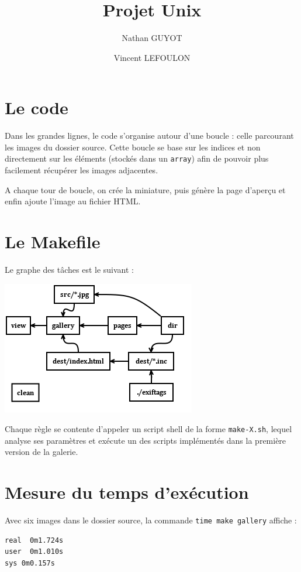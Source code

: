 \documentclass[a4paper,11pt]{article}
\title{Projet Unix}
\author{Nathan GUYOT \and Vincent LEFOULON}
\begin{document}
\maketitle

\section{Le code}

Dans les grandes lignes, le code s'organise autour d'une boucle : celle parcourant
les images du dossier source. Cette boucle se base sur les indices et non directement
sur les éléments (stockés dans un \verb+array+) afin de pouvoir plus facilement
récupérer les images adjacentes.

A chaque tour de boucle, on crée la miniature, puis génère la page d'aperçu et enfin ajoute l'image au fichier HTML.

\section{Le Makefile}

Le graphe des tâches est le suivant :

\includegraphics[width=320px]{MakefileGraph.png}

Chaque règle se contente d'appeler un script shell de la forme \verb+make-X.sh+, lequel analyse ses paramètres et exécute un des scripts implémentés dans la première version de la galerie.

\section{Mesure du temps d'exécution}

Avec six images dans le dossier source, la commande \verb+time make gallery+ affiche :

\begin{verbatim}
real  0m1.724s
user  0m1.010s
sys 0m0.157s
\end{verbatim}
\end{document}
